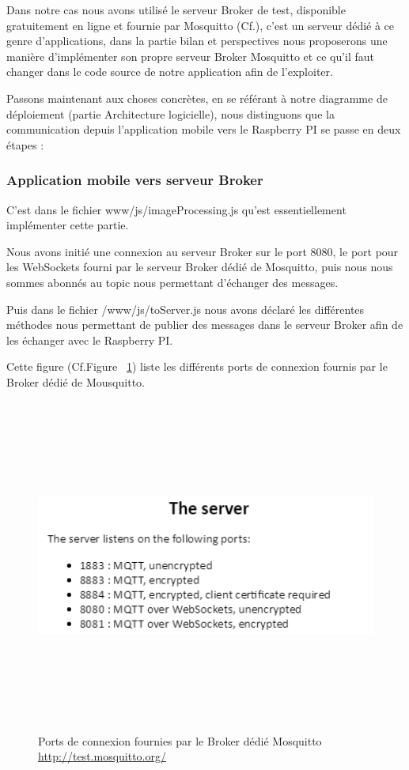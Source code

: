 \documentclass[12pt,a4paper]{article}
\begin{document}
Dans notre cas nous avons utilisé le serveur Broker de test, disponible gratuitement en ligne et fournie par Mosquitto (Cf.\cite{Ref29}), c'est un serveur dédié à ce genre d'applications, dans la partie bilan et perspectives nous proposerons une manière d'implémenter son  propre serveur Broker Mosquitto et ce qu'il faut changer dans le code source de notre application afin de l’exploiter.\par
Passons maintenant aux choses concrètes, en se référant à notre diagramme de déploiement (partie Architecture logicielle), nous distinguons que la communication depuis l'application mobile vers le Raspberry PI se passe en deux étapes :

\subsubsection{Application mobile vers serveur Broker}
C'est dans le fichier www/js/imageProcessing.js qu'est essentiellement implémenter cette partie.\par
Nous avons initié une connexion au serveur Broker sur le port 8080, le port pour les WebSockets fourni par le serveur Broker dédié de Mosquitto, puis nous nous sommes abonnés au topic nous permettant d'échanger des messages.\par

Puis dans le fichier /www/js/toServer.js nous avons déclaré les différentes méthodes nous permettant de publier des messages dans le serveur Broker afin de les échanger avec le Raspberry PI.\par
Cette figure (Cf.Figure ~\ref{the_server}) liste les différents ports de connexion fournis par le Broker dédié de Mousquitto.

\begin{figure}[ht]
\centering
	  \includegraphics[width = 15cm,height=11cm]{mosquitto_test_ports.png}
     \caption{Ports de connexion fournies par le Broker dédié Mosquitto 
     \href{url}{http://test.mosquitto.org/}  }
	\label{the_server}
\end{figure}
\end{document}
